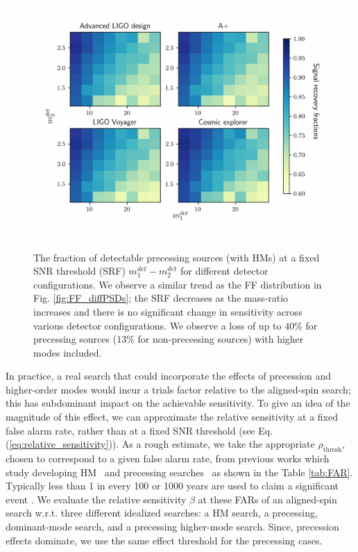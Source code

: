 \begin{figure}
        \centering
        \includegraphics[width=13cm, height = 10cm]{figures/HM_and_precession/SRF_diffPSDs.pdf}
        \caption{The fraction of detectable precessing sources (with HMs) at a fixed SNR threshold (SRF) $m_1^{det}-m_2^{det}$ for different detector configurations. We observe a similar trend as the FF distribution in Fig. \ref{fig:FF_diffPSDs}; the SRF decreases as the mass-ratio increases and there is no significant change in sensitivity across various detector configurations. We observe a loss of up to $40 \%$ for precessing sources ($13\%$ for non-precessing sources) with higher modes included.}
        \label{fig:SRF_diffPSDs}
\end{figure}

In practice, a real search that could incorporate the effects of precession and higher-order modes
would incur a trials factor relative to the aligned-spin search; this has subdominant impact on the achievable sensitivity. To give an idea of the magnitude of this effect, we can approximate the relative sensitivity at a fixed false alarm rate, rather than at a fixed SNR threshold (see Eq. (\ref{eq:relative_sensitivity})). As a rough estimate, we take the appropriate $\rho_{\text{thresh}}$, chosen to correspond to a given false alarm rate, from previous works which study developing HM~\cite{Harry:2017weg} and precessing searches~\cite{Harry:2016ijz} as shown in the Table \ref{tab:FAR}. 
Typically less than 1 in every 100 or 1000 years are used to claim a significant event \cite{Usman:2015kfa, Messick:2016aqy}. We evaluate the relative sensitivity $\beta$ at these FARs of an aligned-spin search w.r.t. three different idealized searches: a HM search, a precessing, dominant-mode search, and a precessing higher-mode search. Since, precession effects dominate, we use the same effect threshold for the precessing cases.


